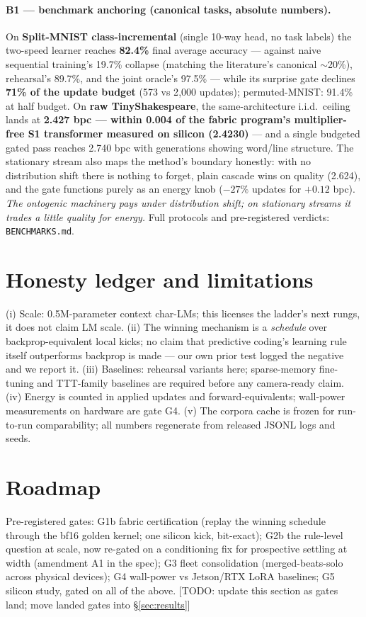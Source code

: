 \documentclass[11pt]{article}
\newcommand{\todo}[1]{\textcolor{red!70!black}{[TODO: #1]}}
\newcommand{\gate}[1]{\textsf{#1}}
\begin{document}
\paragraph{B1 --- benchmark anchoring (canonical tasks, absolute numbers).}
On \textbf{Split-MNIST class-incremental} (single 10-way head, no task labels) the two-speed
learner reaches \textbf{82.4\%} final average accuracy --- against naive sequential training's
19.7\% collapse (matching the literature's canonical $\sim$20\%), rehearsal's 89.7\%, and the
joint oracle's 97.5\% --- while its surprise gate declines \textbf{71\% of the update budget}
(573 vs 2{,}000 updates); permuted-MNIST: 91.4\% at half budget. On \textbf{raw
TinyShakespeare}, the same-architecture i.i.d.\ ceiling lands at \textbf{2.427 bpc ---
within 0.004 of the fabric program's multiplier-free S1 transformer measured on silicon
(2.4230)} --- and a single budgeted gated pass reaches 2.740 bpc with generations showing
word/line structure. The stationary stream also maps the method's boundary honestly: with no
distribution shift there is nothing to forget, plain cascade wins on quality (2.624), and the
gate functions purely as an energy knob ($-27\%$ updates for $+0.12$ bpc). \emph{The
ontogenic machinery pays under distribution shift; on stationary streams it trades a little
quality for energy.} Full protocols and pre-registered verdicts: \texttt{BENCHMARKS.md}.

\section{Honesty ledger and limitations}\label{sec:honesty}
(i) Scale: 0.5M-parameter context char-LMs; this licenses the ladder's next rungs, it does not
claim LM scale. (ii) The winning mechanism is a \emph{schedule} over backprop-equivalent local
kicks; no claim that predictive coding's learning rule itself outperforms backprop is made ---
our own prior test logged the negative and we report it. (iii) Baselines: rehearsal variants
here; sparse-memory fine-tuning \citep{meta2025sparsemem} and TTT-family baselines are
required before any camera-ready claim. (iv) Energy is counted in applied updates and
forward-equivalents; wall-power measurements on hardware are gate \gate{G4}. (v) The corpora
cache is frozen for run-to-run comparability; all numbers regenerate from released JSONL logs
and seeds.

\section{Roadmap}\label{sec:roadmap}
Pre-registered gates: \gate{G1b} fabric certification (replay the winning schedule through the
bf16 golden kernel; one silicon kick, bit-exact); \gate{G2b} the rule-level question at scale,
now re-gated on a conditioning fix for prospective settling at width (amendment A1 in the
spec); \gate{G3} fleet consolidation (merged-beats-solo across physical devices); \gate{G4}
wall-power vs Jetson/RTX LoRA baselines; \gate{G5} silicon study, gated on all of the above.
\todo{update this section as gates land; move landed gates into \S\ref{sec:results}}
\end{document}

